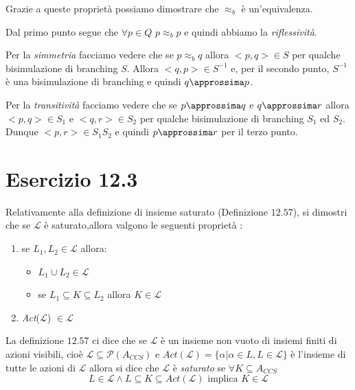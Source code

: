 		\vspace{5 mm}
		Grazie a queste proprietà possiamo dimostrare che $\approx_{b}$ è un'equivalenza.
		
		Dal primo punto segue che $\forall p \in Q$ $p\approx_{b}p$ e quindi abbiamo la \emph{riflessività}.
		
		Per la \emph{simmetria} facciamo vedere che se $p\approx_{b}q$ allora $<p,q>\in S$ per qualche bisimulazione di branching $S$. Allora $<q,p>\in S^{-1}$ e, per il secondo punto, $S^{-1}$ è una bisimulazione di branching e quindi $q\approssima p$.
		
		Per la \emph{transitività} facciamo vedere che se $p \approssima q$ e $q \approssima r$ allora $<p,q>\in S_{1}$ e $<q,r>\in S_{2}$ per qualche bisimulazione di branching $S_{1}$ ed $S_{2}$. Dunque $<p,r> \in S_{1}S_{2}$ e quindi $p\approssima r$ per il terzo punto.
		
		\newpage
		
	\section{Esercizio 12.3}
		\quad Relativamente alla definizione di insieme saturato (Definizione $12.57$), si dimostri che se $\mathcal{L}$ è saturato,allora valgono le
		seguenti proprietà :
		\begin{enumerate}
		  \item se $L_1,L_2 \in \mathcal{L}$ allora:
		  \begin{itemize}
		    \item $L_1 \cup L_2 \in \mathcal{L}$
		    \item se $L_1 \subseteq K \subseteq L_2$ allora $K \in \mathcal{L}$
		  \end{itemize}
		  \item \emph{Act}($\mathcal{L}$) $\in \mathcal{L}$
		\end{enumerate}
		
		\sectionline
		
		La definizione $12.57$ ci dice che se $\mathcal{L}$ è un insieme non vuoto di insiemi finiti di azioni visibili, cioè $\mathcal{L}\subseteq\mathcal{P}(A_{CCS})$ e $Act(\mathcal{L}) = \{ \alpha|\alpha\in L, L\in \mathcal{L}\}$ è l'insieme di tutte le azioni di $\mathcal{L}$ allora si dice che $\mathcal{L}$ è \emph{saturato} se $\forall K \subseteq A_{CCS}$ $$L\in\mathcal{L}\land L\subseteq K \subseteq Act(\mathcal{L}) \text{ implica } K \in \mathcal{L}$$
		
